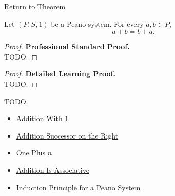 \newpage
{}
\label{prf:addition-commutative}

\begin{remark*}[Return]
\hyperref[thm:addition-commutative]{Return to Theorem}
\end{remark*}

\begin{theorem*}
Let $(P,S,1)$ be a Peano system. For every $a,b \in P$,
\[
a+b=b+a.
\]
\end{theorem*}

\begin{proof}
\textbf{Professional Standard Proof.}~\\
TODO.
\end{proof}

\begin{proof}
\textbf{Detailed Learning Proof.}~\\
TODO.
\end{proof}

\begin{remark*}
TODO.
\end{remark*}

\begin{dependencies}
\begin{itemize}
  \item \hyperref[thm:addition-with-one]{Addition With $1$}
  \item \hyperref[thm:addition-successor-on-right]{Addition Successor on the Right}
  \item \hyperref[thm:one-plus-n]{One Plus $n$}
  \item \hyperref[thm:addition-associative]{Addition Is Associative}
  \item \hyperref[thm:induction-principle-for-peano-system]{Induction Principle for a Peano System}
\end{itemize}
\end{dependencies}
